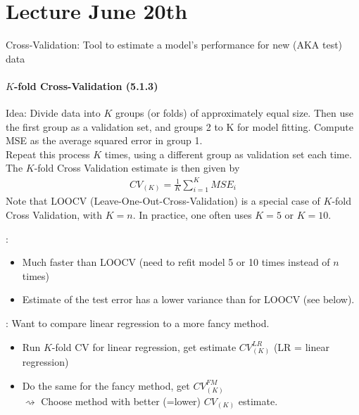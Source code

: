 \documentclass[11pt,a4paper,numbers=endperiod]{scrartcl}
\newcommand{\tit}[1]{\begin{large} \underline{\text{#1}}\end{large}}
\begin{document}
{\section{Lecture June 20th} 

Cross-Validation: Tool to estimate a model's performance for new (AKA test) data\\

\paragraph{$K$-fold Cross-Validation (5.1.3)}
$ $\\

Idea: Divide data into $K$ groups (or folds) of approximately equal size. 
Then use the first group as a validation set, and groups 2 to K for model fitting. Compute MSE as the average squared error in group 1.\\
Repeat this process $K$ times, using a different group as validation set each time. The $K$-fold Cross Validation estimate is then given by \begin{align*}
	CV_{(K)} = \frac{1}{K} \sum\limits_{i = 1}^K MSE_i
\end{align*}
Note that LOOCV (Leave-One-Out-Cross-Validation) is a special case of $K$-fold Cross Validation, with $K = n$. In practice, one often uses $K = 5$ or $K = 10$.

\tit{Pro}: \begin{itemize}
	\item Much faster than LOOCV (need to refit model 5 or 10 times instead of $n$ times)
	\item Estimate of the test error has a lower variance than for LOOCV (see below).
\end{itemize}

\tit{Example}: Want to compare linear regression to a more fancy method. \begin{itemize}
	\item Run $K$-fold CV for linear regression, get estimate $CV_{(K)}^{LR}$ (LR = linear regression)
	\item Do the same for the fancy method, get $CV_{(K)}^{FM}$\\
	$\rightsquigarrow$ Choose method with better (=lower) $CV_{(K)}$ estimate. 
\end{itemize}

}
\end{document}
